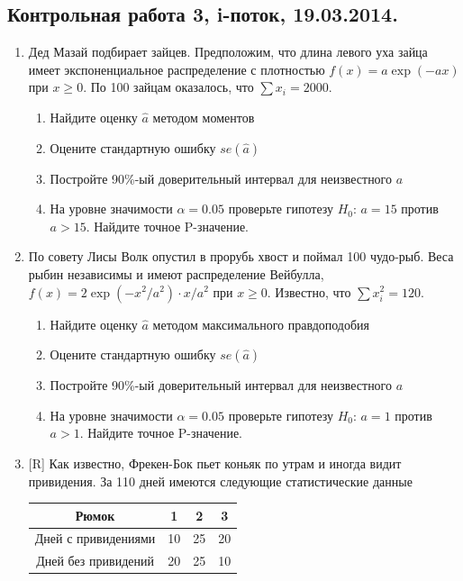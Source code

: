 \documentclass[12pt, a4paper]{article}\usepackage[]{graphicx}\usepackage[]{color}
\begin{document}
\subsection{Контрольная работа 3, i-поток, 19.03.2014. }

\begin{enumerate}
\item Дед Мазай подбирает зайцев. Предположим, что длина левого уха зайца имеет экспоненциальное распределение с плотностью $f(x)=a\exp(-ax)$ при $x\geq 0$. По 100 зайцам оказалось, что $\sum x_i=2000$.
\begin{enumerate}
\item  Найдите оценку $\hat{a}$ методом моментов
\item Оцените стандартную ошибку $se(\hat{a})$
\item Постройте 90\%-ый доверительный интервал для неизвестного $a$
\item На уровне значимости $\alpha=0.05$ проверьте гипотезу $H_0$: $a=15$ против $a>15$. Найдите точное P-значение.
\end{enumerate}

\item По совету Лисы Волк опустил в прорубь хвост и поймал 100 чудо-рыб. Веса рыбин независимы и имеют распределение Вейбулла, $f(x)=2\exp(-x^2/a^2)\cdot x/a^2$ при $x\geq 0$. Известно, что $\sum x_i^2=120$.
\begin{enumerate}
\item  Найдите оценку $\hat{a}$ методом максимального правдоподобия
\item Оцените стандартную ошибку $se(\hat{a})$
\item Постройте 90\%-ый доверительный интервал для неизвестного $a$
\item На уровне значимости $\alpha=0.05$ проверьте гипотезу $H_0$: $a=1$ против $a>1$. Найдите точное P-значение.
\end{enumerate}


\item $[$R] Как известно, Фрекен-Бок пьет коньяк по утрам и иногда видит привидения. За 110 дней имеются следующие статистические данные


\begin{tabular}{c|ccc}
Рюмок & 1 & 2 & 3 \\
\hline
Дней с привидениями & 10 & 25 & 20 \\
Дней без привидений & 20 &  25 & 10 \\
\end{tabular}


\end{enumerate}
\end{document}
